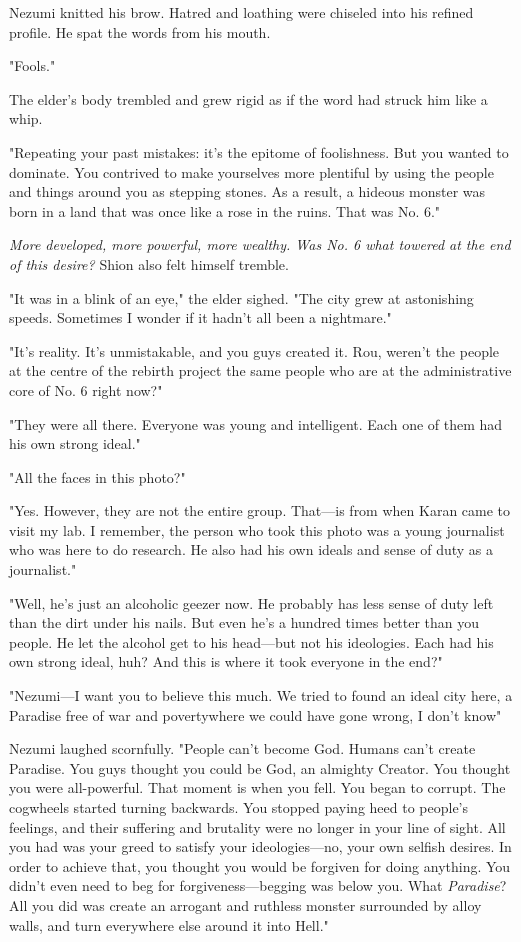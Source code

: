 Nezumi knitted his brow. Hatred and loathing were chiseled into his
refined profile. He spat the words from his mouth.

"Fools."

The elder's body trembled and grew rigid as if the word had struck him
like a whip.

"Repeating your past mistakes: it's the epitome of foolishness. But you
wanted to dominate. You contrived to make yourselves more plentiful by
using the people and things around you as stepping stones. As a result,
a hideous monster was born in a land that was once like a rose in the
ruins. That was No. 6."

\emph{More developed, more powerful, more wealthy. Was No. 6 what towered at
the end of this desire?} Shion also felt himself tremble.

"It was in a blink of an eye," the elder sighed. "The city grew at
astonishing speeds. Sometimes I wonder if it hadn't all been a
nightmare."

"It's reality. It's unmistakable, and you guys created it. Rou, weren't
the people at the centre of the rebirth project the same people who are
at the administrative core of No. 6 right now?"

"They were all there. Everyone was young and intelligent. Each one of
them had his own strong ideal."

"All the faces in this photo?"

"Yes. However, they are not the entire group. That---is from when Karan
came to visit my lab. I remember, the person who took this photo was a
young journalist who was here to do research. He also had his own ideals
and sense of duty as a journalist."

"Well, he's just an alcoholic geezer now. He probably has less sense of
duty left than the dirt under his nails. But even he's a hundred times
better than you people. He let the alcohol get to his head---but not his
ideologies. Each had his own strong ideal, huh? And this is where it
took everyone in the end?"

"Nezumi---I want you to believe this much. We tried to found an ideal city
here, a Paradise free of war and poverty\el where we could have gone
wrong, I don't know\el "

Nezumi laughed scornfully. "People can't become God. Humans can't create
Paradise. You guys thought you could be God, an almighty Creator. You
thought you were all-powerful. That moment is when you fell. You began
to corrupt. The cogwheels started turning backwards. You stopped paying
heed to people's feelings, and their suffering and brutality were no
longer in your line of sight. All you had was your greed to satisfy your
ideologies---no, your own selfish desires. In order to achieve that, you
thought you would be forgiven for doing anything. You didn't even need
to beg for forgiveness---begging was below you. What \emph{Paradise}? All you did
was create an arrogant and ruthless monster surrounded by alloy walls,
and turn everywhere else around it into Hell."

